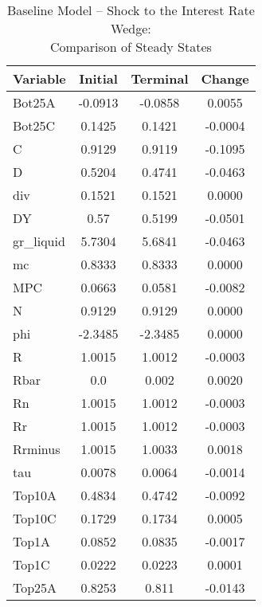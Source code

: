 \documentclass[12pt]{article} %
\numberwithin{equation}{section} %
\numberwithin{figure}{section}
\numberwithin{table}{section}
\begin{document}
\begin{table}[ht]
\centering
\caption{Baseline Model -- Shock to the Interest Rate Wedge: \\ Comparison of Steady States}
\label{tab:stst_comparison_baseline_wedge_permanent}
\begin{tabular}{lccc}
                Variable & Initial & Terminal &  Change \\
\hline
\hline
                  Bot25A & -0.0913 &  -0.0858 &  0.0055 \\
                  Bot25C &  0.1425 &   0.1421 & -0.0004 \\
                       C &  0.9129 &   0.9119 & -0.1095 \\
                       D &  0.5204 &   0.4741 & -0.0463 \\
                     div &  0.1521 &   0.1521 &  0.0000 \\
                      DY &    0.57 &   0.5199 & -0.0501 \\
               gr\_liquid &  5.7304 &   5.6841 & -0.0463 \\
                      mc &  0.8333 &   0.8333 &  0.0000 \\
                     MPC &  0.0663 &   0.0581 & -0.0082 \\
                       N &  0.9129 &   0.9129 &  0.0000 \\
                     phi & -2.3485 &  -2.3485 &  0.0000 \\
                       R &  1.0015 &   1.0012 & -0.0003 \\
                    Rbar &     0.0 &    0.002 &  0.0020 \\
                      Rn &  1.0015 &   1.0012 & -0.0003 \\
                      Rr &  1.0015 &   1.0012 & -0.0003 \\
                 Rrminus &  1.0015 &   1.0033 &  0.0018 \\
                     tau &  0.0078 &   0.0064 & -0.0014 \\
                  Top10A &  0.4834 &   0.4742 & -0.0092 \\
                  Top10C &  0.1729 &   0.1734 &  0.0005 \\
                   Top1A &  0.0852 &   0.0835 & -0.0017 \\
                   Top1C &  0.0222 &   0.0223 &  0.0001 \\
                  Top25A &  0.8253 &    0.811 & -0.0143 \\

\end{tabular}
\end{table}
\end{document}
